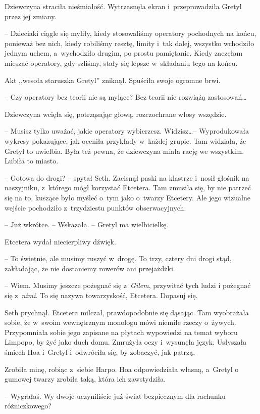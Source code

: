 \documentclass[oneside,polish,11pt,sfheadings]{mwbk}
\begin{document}
Dziewczyna straciła nieśmiałość. Wytrzasnęła ekran i~przeprowadziła
Gretyl przez jej zmiany. 

-- Dzieciaki ciągle się myliły, kiedy
stosowaliśmy operatory pochodnych na końcu, ponieważ bez nich, kiedy
robiliśmy resztę, limity i~tak dalej, wszystko wchodziło jednym uchem, a~wychodziło drugim, po prostu pamiętanie. Kiedy zaczęłam mieszać
operatory, gdy szliśmy, stały się lepsze w~składaniu tego na końcu.

Akt ,,wesoła staruszka Gretyl'' zniknął. Spuściła swoje ogromne brwi.

-- Czy operatory bez teorii nie są mylące? Bez teorii nie rozwiążą
zastosowań\ldots 

Dziewczyna wcięła się, potrząsając głową, rozczochrane włosy wszędzie. 

-- Musisz tylko uważać, jakie operatory wybierzesz. Widzisz\ldots  -- Wyprodukowała wykresy pokazujące, jak oceniła przykłady w~każdej grupie.
Tam widziała, że Gretyl to uwielbia. Była też pewna, że dziewczyna miała
rację we wszystkim. Lubiła to miasto.

-- Gotowa do drogi? -- spytał Seth. Zacisnął paski na klastrze i~nosił
głośnik na naszyjniku, z~którego mógł korzystać Etcetera. Tam zmusiła
się, by nie patrzeć się na to, kuszące było myśleć o~tym jako o~twarzy
Etcetery. Ale jego wizualne wejście pochodziło z~trzydziestu punktów
obserwacyjnych.

-- Już wkrótce. -- Wskazała. -- Gretyl ma wielbicielkę.

Etcetera wydał niecierpliwy dźwięk. 

-- To świetnie, ale musimy ruszyć w~drogę. To trzy, cztery dni drogi stąd, zakładając, że nie dostaniemy
rowerów ani przejażdżki.

-- Wiem. Musimy jeszcze pożegnać się z~\textit{Gilem}, przywitać tych ludzi
i pożegnać się z~\textit{nimi}. To się nazywa towarzyskość, Etcetera.
Dopasuj się.

Seth prychnął. Etcetera milczał, prawdopodobnie się dąsając. Tam
wyobrażała sobie, że w~swoim wewnętrznym monologu mówi niemiłe rzeczy o~żywych. Przypomniała sobie jego zapisane na płytach wypowiedzi na temat
wyboru Limpopo, by żyć jako duch domu. Zmrużyła oczy i~wysunęła język.
Usłyszała śmiech Hoa i~Gretyl i~odwróciła się, by zobaczyć, jak patrzą.

Zrobiła minę, robiąc z~siebie Harpo. Hoa odpowiedziała własną, a~Gretyl
o gumowej twarzy zrobiła taką, która ich zawstydziła.

-- Wygrałaś. Wy dwoje uczyniliście już świat bezpiecznym dla rachunku
różniczkowego?
\end{document}
